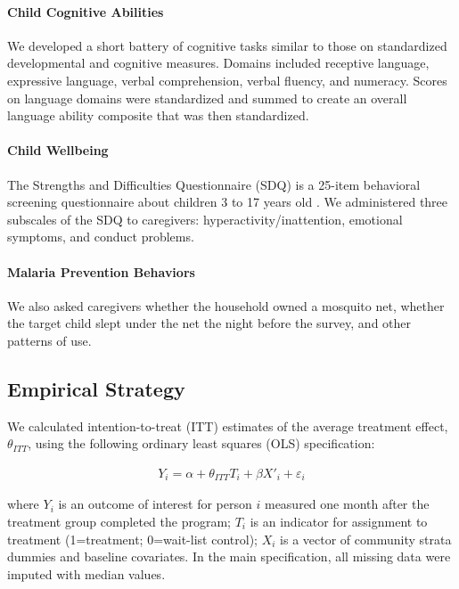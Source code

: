 \documentclass[12pt,authoryear]{elsarticle}\usepackage{knitr}
\begin{document}
\paragraph*{Child Cognitive Abilities}

We developed a short battery of cognitive tasks similar to those on standardized developmental and cognitive measures. Domains included receptive language, expressive language, verbal comprehension, verbal fluency, and numeracy. Scores on language domains were standardized and summed to create an overall language ability composite that was then standardized.  

\paragraph*{Child Wellbeing}

The Strengths and Difficulties Questionnaire (SDQ) is a 25-item behavioral screening questionnaire about children 3 to 17 years old \citep{Goodman:1997}. We administered three subscales of the SDQ to caregivers: hyperactivity/inattention, emotional symptoms, and conduct problems.

\paragraph*{Malaria Prevention Behaviors}

We also asked caregivers whether the household owned a mosquito net, whether the target child slept under the net the night before the survey, and other patterns of use. 

\subsection*{Empirical Strategy}

We calculated intention-to-treat (ITT) estimates of the average treatment effect, $\theta_{ITT}$, using the following ordinary least squares (OLS) specification: 

\begin{align*}
Y_{i} = \alpha + \theta_{ITT}T_{i} + \beta X'_{i} + \varepsilon_{i}
\end{align*}

where $Y_{i}$ is an outcome of interest for person $i$ measured one month after the treatment group completed the program; $T_{i}$ is an indicator for assignment to treatment (1=treatment; 0=wait-list control); $X_{i}$ is a vector of community strata dummies and baseline covariates. In the main specification, all missing data were imputed with median values.
\end{document}
